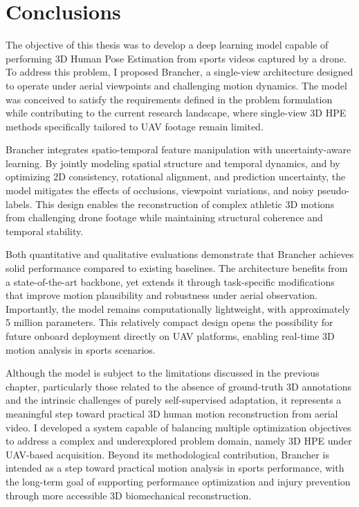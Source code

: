 \chapter{Conclusions}
The objective of this thesis was to develop a deep learning model capable of performing 3D Human Pose Estimation from sports videos captured by a drone. To address this problem, I proposed Brancher, a 
single-view architecture designed to operate under aerial viewpoints and challenging motion dynamics. The model was conceived to satisfy the requirements defined in the problem formulation while 
contributing to the current research landscape, where single-view 3D HPE methods specifically tailored to UAV footage remain limited.

Brancher integrates spatio-temporal feature manipulation with uncertainty-aware learning. By jointly modeling spatial structure and temporal dynamics, and by optimizing 2D consistency, rotational alignment, 
and prediction uncertainty, the model mitigates the effects of occlusions, viewpoint variations, and noisy pseudo-labels. This design enables the reconstruction of complex athletic 3D motions from 
challenging drone footage while maintaining structural coherence and temporal stability.

Both quantitative and qualitative evaluations demonstrate that Brancher achieves solid performance compared to existing baselines. The architecture benefits from a state-of-the-art backbone, yet extends it 
through task-specific modifications that improve motion plausibility and robustness under aerial observation. Importantly, the model remains computationally lightweight, with approximately 5 million 
parameters. This relatively compact design opens the possibility for future onboard deployment directly on UAV platforms, enabling real-time 3D motion analysis in sports scenarios.

Although the model is subject to the limitations discussed in the previous chapter, particularly those related to the absence of ground-truth 3D annotations and the intrinsic challenges of purely 
self-supervised adaptation, it represents a meaningful step toward practical 3D human motion reconstruction from aerial video. I developed a system capable of balancing multiple optimization objectives to 
address a complex and underexplored problem domain, namely 3D HPE under UAV-based acquisition. Beyond its methodological contribution, Brancher is intended as a step toward practical motion analysis in 
sports performance, with the long-term goal of supporting performance optimization and injury prevention through more accessible 3D biomechanical reconstruction.

